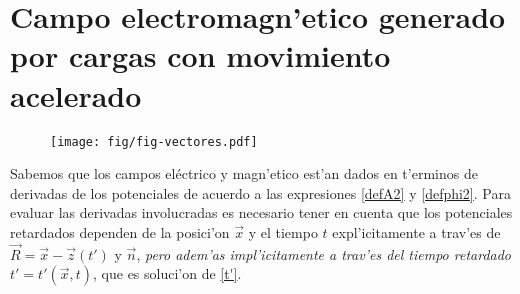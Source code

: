 \section{Campo electromagn'etico generado por cargas con movimiento acelerado}
\begin{figure}[ht]
\centerline{\texttt{[image: fig/fig-vectores.pdf]}}
\label{R7}
\end{figure}
Sabemos que los campos eléctrico y magn'etico est'an dados en t'erminos de derivadas de los potenciales de acuerdo a las expresiones \eqref{defA2} y \eqref{defphi2}. Para evaluar las derivadas involucradas es necesario tener en cuenta que los potenciales retardados dependen de la posici'on $\vec{x}$ y el tiempo $t$ expl'icitamente a trav'es de $\vec{R}=\vec{x}-\vec{z}(t')$ y $\vec{n}$, \textit{pero adem'as impl'icitamente a trav'es del tiempo retardado} $t'=t'(\vec{x},t)$, que es soluci'on de \eqref{t'}.


